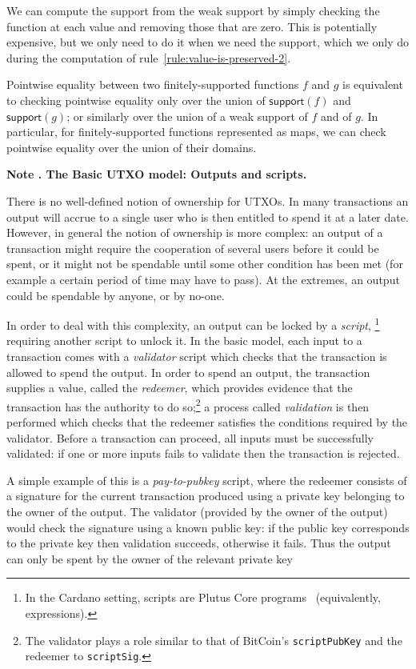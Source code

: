 \documentclass[a4paper]{article}
\newcounter{note}
\newcommand{\note}[1]{
  \bigskip
  \refstepcounter{note}
  \noindent\textbf{Note \thenote. #1}
}
\renewcommand{\i}{\textit}  %
\newcommand{\msf}[1]{\ensuremath{\mathsf{#1}}}
\newcommand{\support}{\msf{support}}
\begin{document}
We can compute the support from the weak support by simply checking the function
at each value and removing those that are zero. This is potentially expensive,
but we only need to do it when we need the support, which we only do during the
computation of rule~\ref{rule:value-is-preserved-2}.

Pointwise equality between two finitely-supported functions $f$ and $g$ is
equivalent to checking pointwise equality only over the union of $\support(f)$
and $\support(g)$; or similarly over the union of a weak support of $f$ and of
$g$. In particular, for finitely-supported functions represented as maps, we can
check pointwise equality over the union of their domains.

\note{The Basic UTXO model: Outputs and scripts.}
\label{note:basic-utxo}
There is no well-defined notion of ownership for UTXOs.  In many
transactions an output will accrue to a single user who is then
entitled to spend it at a later date.  However, in general the notion
of ownership is more complex: an output of a transaction might require
the cooperation of several users before it could be spent, or it might
not be spendable until some other condition has been met (for example
a certain period of time may have to pass).  At the extremes, an
output could be spendable by anyone, or by no-one.

In order to deal with this complexity, an output can be locked by a
\textit{script},%
\footnote{In the Cardano setting, scripts are Plutus Core
  programs~\citep{Plutus-Core-spec} (equivalently, expressions).  }
requiring another script to unlock it.  In the basic model, each input
to a transaction comes with a \i{validator} script which checks that
the transaction is allowed to spend the output. In order to spend an
output, the transaction supplies a value, called the
\i{redeemer}, which provides evidence that the transaction has the
authority to do so;\footnote{The validator plays a role similar to
  that of BitCoin's \texttt{scriptPubKey} and the redeemer to
  \texttt{scriptSig}.  } a process called \i{validation} is then
performed which checks that the redeemer satisfies the conditions
required by the validator. Before a transaction can proceed, all inputs
must be successfully validated: if one or more inputs fails to
validate then the transaction is rejected.

A simple example of this is a \i{pay-to-pubkey} script, where the
redeemer consists of a signature for the current transaction produced
using a private key belonging to the owner of the output.  The
validator (provided by the owner of the output) would check the
signature using a known public key: if the public key corresponds to
the private key then validation succeeds, otherwise it fails.  Thus
the output can only be spent by the owner of the relevant private key
\end{document}
